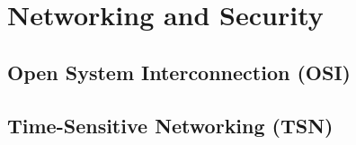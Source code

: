 \chapter{Networking and Security}

\section{Open System Interconnection (OSI)}


\section{Time-Sensitive Networking (TSN)}
